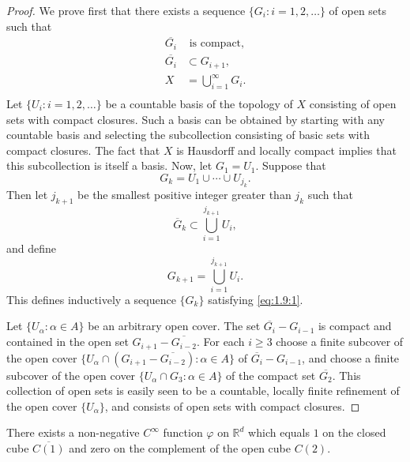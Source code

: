 \begin{proof}
	We prove first that there exists a sequence  $ \{G_{i}: i = 1, 2, \ldots\} $ of open sets such that
	\begin{equation}
		\tag{1}\label{eq:1.9:1}
		\begin{aligned}{\overline{{G_{i}}}} & {{}\text{ is compact,}} \\
		               {\overline{{G_{i}}}} & {{}\subset G_{i+1},}    \\ {X}&{{}=\bigcup_{i=1}^{\infty}G_{i}.}\\\end{aligned}
	\end{equation}
	Let $\{U_{i}: i=1,2,\ldots\}$ be a countable basis of the topology of $X$
	consisting of open sets with compact closures. Such a basis can be
	obtained by starting with any countable basis and selecting the
	subcollection consisting of basic sets with compact closures.
	The fact that $X$ is Hausdorff and locally compact implies that this
	subcollection is itself a basis. Now, let $G_{1}=U_{1}$. Suppose that
	\[
		G_{k}=U_{1}\cup\cdots\cup U_{j_{k}}.
	\]
	Then let  $ j_{k+1} $ be the smallest positive integer greater than  $ j_{k} $ such that
	\[
		\overline{{G}}_{k}\subset\bigcup_{i=1}^{j_{k+1}}U_{i},
	\]
	and define
	\[
		G_{k+1}=\bigcup_{i=1}^{j_{k+1}}U_{i}.
	\]
	This defines inductively a sequence  $ \{G_{k}\} $ satisfying \eqref{eq:1.9:1}.
	\begin{center}\end{center}
	Let $\{U_\alpha : \alpha \in A\}$ be an arbitrary open cover. The set $\overline{G_i} - G_{i-1}$
	is compact and contained in the open set $G_{i+1} - \overline{G_{i-2}}$.
	For each $i \geq 3$ choose a finite subcover of the open cover
	$\{U_\alpha \cap (G_{i+1} - \overline{G_{i-2}}): \alpha \in A\}$ of
	$\overline{G_i} - G_{i-1}$, and choose a finite subcover of the open
	cover $\{U_\alpha \cap G_3 : \alpha \in A\}$ of the compact set $\overline{G_2}$.
	This collection of open sets is easily seen to be a countable,
	locally finite refinement of the open cover $\{U_\alpha\}$, and consists of open sets with compact closures.
\end{proof}

\begin{lemma}\label{thm:1.10}
	There exists a non-negative $C^{\infty}$ function $\varphi$ on
	$\mathbb{R}^{d}$ which equals $1$ on the closed cube $\overline{C(1)}$
	and zero on the complement of the open cube $C(2)$.
\end{lemma}

